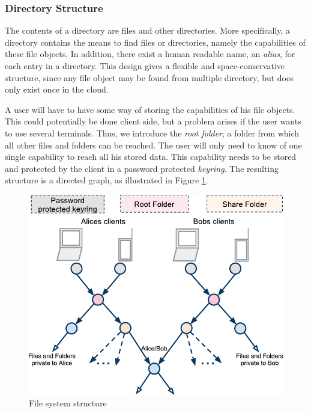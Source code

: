 \documentclass[pdftex,english,10pt,b5paper,twoside]{book}
\begin{document}
\subsubsection{Directory Structure}

The contents of a directory are files and other directories. More specifically,
a directory contains the means to find files or directories, namely the
capabilities of these file objects. In addition, there exist a human readable
name, an \emph{alias}, for each entry in a directory. This design gives a
flexible and space-conservative structure, since any file object may be found
from multiple directory, but does only exist once in the cloud.

A user will have to have some way of storing the capabilities of his file
objects. This could potentially be done client side, but a problem arises if
the user wants to use several terminals. Thus, we introduce the \emph{root
folder}, a folder from which all other files and folders can be reached. The
user will only need to know of one single capability to reach all his stored
data. This capability needs to be stored and protected by the client in a
password protected \emph{keyring}. The resulting structure is a
directed graph, as illustrated in Figure \ref{fig:AS:filesystem}.

\begin{figure}[h!]
    \centering
    \includegraphics[width=\columnwidth]{ArchitectureFileSystem.pdf}
    \caption{File system structure}
    \label{fig:AS:filesystem}
\end{figure}
\end{document}

